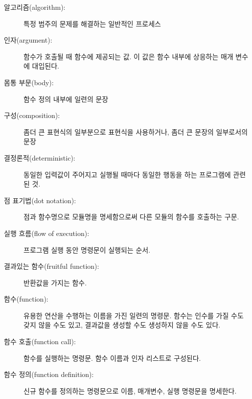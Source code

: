 \begin{description}

\item[알고리즘(algorithm):] 특정 범주의 문제를 해결하는 일반적인 프로세스

\item[인자(argument):] 함수가 호출될 때 함수에 제공되는 값. 이 값은 함수 내부에 상응하는 매개 변수에 대입된다.

\item[몸통 부문(body):] 함수 정의 내부에 일련의 문장

\item[구성(composition):] 
좀더 큰 표현식의 일부분으로 표현식을 사용하거나, 좀더 큰 문장의 일부로서의 문장

\item[결정론적(deterministic):] 동일한 입력값이 주어지고 실행될 때마다 동일한 행동을 하는 프로그램에 관련된 것.

\item[점 표기법(dot notation):] 점과 함수명으로 모듈명을 명세함으로써 다른 모듈의 함수를 호출하는 구문.

\item[실행 흐름(flow of execution):] 프로그램 실행 동안 명령문이 실행되는 순서.

\item[결과있는 함수(fruitful function):] 반환값을 가지는 함수.

\item[함수(function):] 유용한 연산을 수행하는 이름을 가진 일련의 명령문.
함수는 인수를 가질 수도 갖지 않을 수도 있고, 결과값을 생성할 수도 생성하지 않을 수도 있다.

\item[함수 호출(function call):] 함수를 실행하는 명령문. 함수 이름과 인자 리스트로 구성된다.

\item[함수 정의(function definition):] 신규 함수를 정의하는 명령문으로 이름, 매개변수, 실행 명령문을 명세한다.


\end{description}
